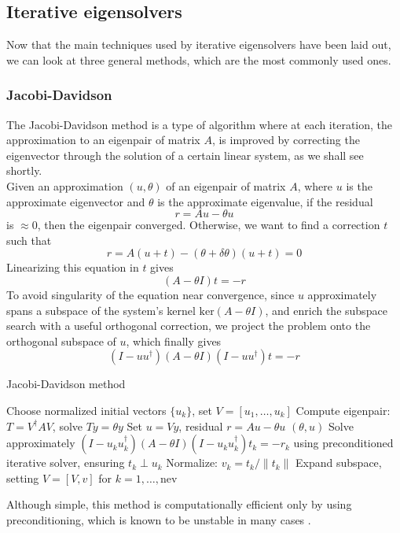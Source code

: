 \subsection{Iterative eigensolvers}
\label{sec:eigensolvers}
Now that the main techniques used by iterative eigensolvers have been laid out, we can look at three general methods, which are the most commonly used ones.
\subsubsection{Jacobi-Davidson}
The Jacobi-Davidson method is a type of algorithm where at each iteration, the approximation to an eigenpair of matrix $A$, is improved by correcting the eigenvector through the solution of a certain linear system, as we shall see shortly.
\\Given an approximation $(u, \theta)$ of an eigenpair of matrix $A$, where $u$ is the approximate eigenvector and $\theta$ is the approximate eigenvalue, if the residual
\begin{equation}
    \label{eq:residual}
    r= A u - \theta u
\end{equation}
is $\approx 0$, then the eigenpair converged. Otherwise, we want to find a correction $t$ such that 
\begin{equation}
    \label{eq:jacobi_correction}
    r= A(u+t) - (\theta + \delta \theta) (u+t) = 0 
\end{equation}
Linearizing this equation in $t$ gives
\begin{equation}
   (A - \theta  I ) t = -r 
\end{equation}
To avoid singularity of the equation near convergence, since $u$ approximately spans a subspace of the system's kernel $\text{ker} (A-\theta I)$, and enrich the subspace search with a useful orthogonal correction, we project the problem onto the orthogonal subspace of $u$, which finally gives
\begin{equation}
    \label{eq:jacobi_eq_proj}
    ( I - uu^\dagger) (A - \theta  I )(I - u u^\dagger) t = -r
\end{equation}
\begin{algorithm}[h]
\caption{Jacobi-Davidson method}
\begin{algorithmic}[1]
\STATE Choose normalized initial vectors $\{u_k\}$, set $V = [u_1, \ldots, u_{k}]$
\REPEAT
    \STATE Compute eigenpair: $T = V^\dagger A V$, solve $T y = \theta y$
    \STATE Set $u = V y$, residual $r = A u - \theta u$
         \RETURN $(\theta, u)$
    \ENDIF
    \STATE Solve approximately $(I - u_k u_k^\dagger)(A - \theta I)(I - u_k u_k^\dagger) t_k = -r_k$
        using preconditioned iterative solver, ensuring $t_k \perp u_k$
    \STATE Normalize: $v_k = t_k / \|t_k\|$
    \STATE Expand subspace, setting $V = [V, v]$
for $k = 1, \dots, \text{nev}$
\end{algorithmic}
\end{algorithm}
Although simple, this method is computationally efficient only by using preconditioning, which is known to be unstable in many cases \cite{Saad1992}.
